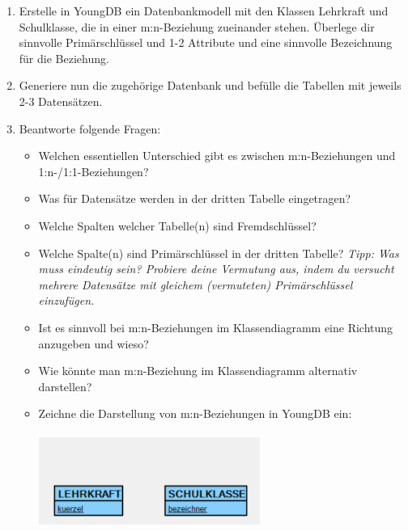 
\begin{enumerate}
    \item Erstelle in YoungDB ein Datenbankmodell mit den Klassen Lehrkraft und Schulklasse, die in einer m:n-Beziehung zueinander stehen. Überlege dir sinnvolle Primärschlüssel und 1-2 Attribute und eine sinnvolle Bezeichnung für die Beziehung.
    \item Generiere nun die zugehörige Datenbank und befülle die Tabellen mit jeweils 2-3 Datensätzen.
    \item Beantworte folgende Fragen:\begin{itemize}
        \item Welchen essentiellen Unterschied gibt es zwischen m:n-Beziehungen und 1:n-/1:1-Beziehungen?\\
        \item Was für Datensätze werden in der dritten Tabelle eingetragen?\\
        \item Welche Spalten welcher Tabelle(n) sind Fremdschlüssel?\\
        \item Welche Spalte(n) sind Primärschlüssel in der dritten Tabelle? \emph{Tipp: Was muss eindeutig sein? Probiere deine Vermutung aus, indem du versucht mehrere Datensätze mit gleichem (vermuteten) Primärschlüssel einzufügen.} 
        \\
        \item Ist es sinnvoll bei m:n-Beziehungen im Klassendiagramm eine Richtung anzugeben und wieso?
        \\
        \item Wie könnte man m:n-Beziehung im Klassendiagramm alternativ darstellen?
        \\
        \item Zeichne die Darstellung von m:n-Beziehungen in YoungDB ein:\\\\
        \includegraphics[width=0.6\textwidth]{img/YDB_lehrerKlasse.png}
    \end{itemize}
\end{enumerate} 